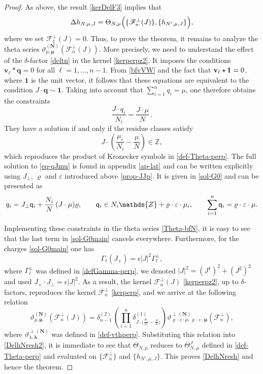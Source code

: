 \documentclass[12pt,letterpaper]{JHEP3}
\def\be{\begin{equation}}
\def\ee{\end{equation}}
\def\({\left(}
\def\){\right)}
\newcommand{\vth}{\vartheta}
\def\vrh{\varrho}
\newcommand{\eps}{\epsilon}
\newcommand{\veps}{\varepsilon}
\newcommand{\cF}{\mathcal{F}}
\newcommand{\qsf}{{\sf q}}
\newcommand{\IZ}{\mathds{Z}}
\def\Fv{\mathscr{F}}
\newcommand{\bffv}{{\bf v}}
\newcommand{\bfv}{{\boldsymbol v}}
\newcommand{\bfq}{{\boldsymbol q}}
\newcommand{\bfN}{{\boldsymbol N}}
\newcommand{\bflam}{{\boldsymbol \lambda}}
\newcommand{\bfmu}{{\boldsymbol \mu}}
\def\vth{\vartheta}
\def\Fp{\cF^{\perp}}
\begin{document}
\begin{proof}
As above, the result \eqref{kerDelF3} implies that 
\be
\Delta h_{N,\mu,J}
=\Theta_{N,\mu}\Bigl(\{\Fv^\perp_n(J)\},\{h_{N',\mu,J}\}\Bigr),
\label{DelhNresh2}
\ee 
where we set $\Fv^\perp_1(J)=0$.
Thus, to prove the theorem, it remains to analyze the theta series $\vth^{(\bfN)}_{\mu,\bfmu}(\Fv^\perp_n(J))$.
More precisely, we need to understand the effect of the $\delta$-factor \eqref{deltn} in the kernel \eqref{kerperpz2}.
It imposes the conditions $\bfv_\ell\ast\bfq=0$ for all $\ell=1,\dots, n-1$.
From \eqref{bfvVW} and the fact that $\bffv_\ell\star\boldsymbol{1}=0$, where $\boldsymbol{1}$ is the unit vector,
it follows that these equations are equivalent to the condition $J\cdot \bfq \sim \boldsymbol{1}$.
Taking into account that $\sum_{i=1}^n q_i=\mu$, one therefore obtains the constraints
\be 
\frac{J\cdot q_i}{N_i}=\frac{J\cdot \mu}{N}\, .
\label{eq-qJmu}
\ee 
They have a solution if and only if the residue classes satisfy 
\be 
J\cdot \(\frac{\mu_i}{N_i}-\frac{\mu}{N}\)\in\IZ,
\label{cond-mumu}
\ee 
which reproduces the product of Kronecker symbols in \eqref{def-Theta-perp}.
The full solution to \eqref{eq-qJmu} is found in appendix \ref{ap-lat}
and can be written explicitly using $J_\perp$, $\vrh$ and $\veps$ introduced above \eqref{prop-JJp}.
It is given in \eqref{sol-G0} and can be presented as
\be 
q_i=J_\perp\qsf_i+\frac{N_i}{N}\, (J\cdot\mu)\vrh,
\qquad 
\qsf_i\in N_i\IZ+\vrh\cdot\veps\cdot\mu_i,
\qquad 
\sum_{i=1}^n \qsf_i=\vrh\cdot\veps\cdot\mu.
\label{sol-G0main}
\ee 

Implementing these constraints in the theta series \eqref{Theta-bfN}, it is easy to see that the last term in \eqref{sol-G0main}
cancels everywhere. 
Furthermore, for the charges \eqref{sol-G0main} one has 
\be 
\Gamma_{\ell}(J_+)=\eps|J|^2\Gamma^\perp_\ell,
\ee 
where $\Gamma^\perp_\ell$ was defined in \eqref{defGamma-perp}, 
we denoted $|J|^2=(J^1)^2+(J^2)^2$ and used $J_+\cdot J_\perp=\eps|J|^2$.
As a result, the kernel $\Fv^\perp_n(J)$ \eqref{kerperpz2}, up to $\delta$-factors, reproduces the kernel $\Fp_n$ \eqref{kerperp},
and we arrive at the following relation
\be 
\vth^{(\bfN)}_{\mu,\bfmu}(\Fv^\perp_n(J))=\delta^{(2)}_{n-1}\,
\(\prod_{i=1}^n\delta^{(1)}_{J\cdot \bigl(\frac{\mu_i}{N_i}-\frac{\mu}{N}\bigr)}\)
\vth^{\perp(\bfN)}_{\vrh\cdot\veps\cdot\mu,\vrh\cdot\veps\cdot\bfmu}(\Fp_n),
\ee 
where $\vth^{\perp(\bfN)}_{\lambda,\bflam}$ was defined in \eqref{def-vthperp}.
Substituting this relation into \eqref{DelhNresh2}, it is immediate to see that $\Theta_{N,\mu}$ reduces to 
$\Theta^J_{N,\mu}$ defined in \eqref{def-Theta-perp} and evaluated on $\{\Fp_n\}$ and $\{h_{N',\mu,J}\}$.
This proves \eqref{DelhNresh} and hence the theorem.
\end{proof}
\end{document}
